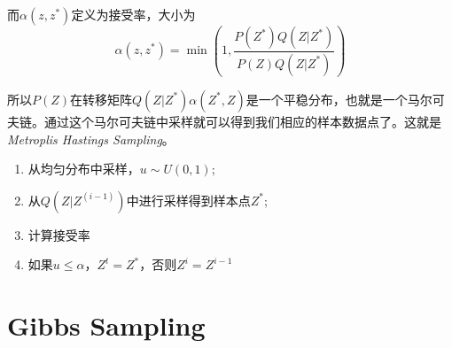而$\alpha(z,z^*)$定义为接受率，大小为
\begin{equation}
    \alpha(z,z^*)=\min\left( 1,\frac{P(Z^*)Q(Z|Z^*)}{P(Z)Q(Z|Z^*)} \right)
\end{equation}

所以$P(Z)$在转移矩阵$Q(Z|Z^*)\alpha(Z^*,Z)$是一个平稳分布，也就是一个马尔可夫链。通过这个马尔可夫链中采样就可以得到我们相应的样本数据点了。这就是\textsl{Metroplis Hastings Sampling}。

\begin{enumerate}[itemindent=2em]
    \item 从均匀分布中采样，$u\sim U(0,1)$;
    \item 从$Q(Z|Z^{(i-1)})$中进行采样得到样本点$Z^*$;
    \item 计算接受率
    \item 如果$u\leqslant \alpha$，$Z^t=Z^*$，否则$Z^i=Z^{i-1}$
\end{enumerate}

\section{Gibbs Sampling}